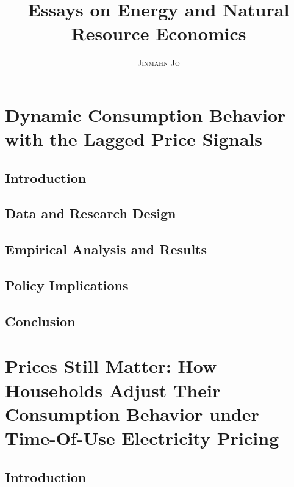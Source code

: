 \documentclass[11pt, final]{ucdavisthesis}
\title {
    Essays on Energy and Natural Resource Economics
}
\author {
    \textsc{Jinmahn Jo}
}
\begin{document}
\makeintropages


\chapter{Dynamic Consumption Behavior with the Lagged Price Signals}
\label{Chapter:Chapter-1}

\section{Introduction}
\label{C1-Section:Introduction}



\section{Data and Research Design}
\label{C1-Section:Data-and-Research-Design}



\section{Empirical Analysis and Results}
\label{C1-Section:Empirical-Analysis-and-Results}



\section{Policy Implications}
\label{C1-Section:Policy-Implications}



\section{Conclusion}
\label{C1-Section:Conclusion}



\chapter{Prices Still Matter: How Households Adjust Their Consumption Behavior under Time-Of-Use Electricity Pricing}
\label{Chapter:Chapter-2}

\section{Introduction}
\label{C2-Section:Introduction}

\end{document}
